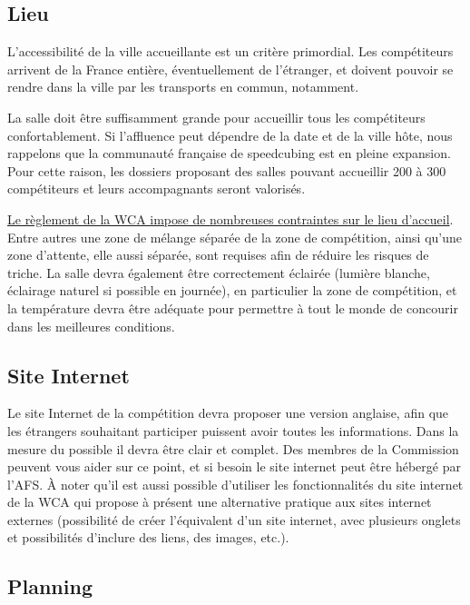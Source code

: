 \documentclass[a4paper,12pt]{scrartcl}
\begin{document}
\subsection*{Lieu}

L'accessibilité de la ville accueillante est un critère primordial. Les compétiteurs arrivent de la France entière, éventuellement de l'étranger, et doivent pouvoir se rendre dans la ville par les transports en commun, notamment.

La salle doit être suffisamment grande pour accueillir tous les compétiteurs confortablement.
Si l'affluence peut dépendre de la date et de la ville hôte, nous rappelons que la communauté française de speedcubing est en pleine expansion. Pour cette raison, les dossiers proposant des salles pouvant accueillir 200 à 300 compétiteurs et leurs accompagnants seront valorisés.

\href{https://www.worldcubeassociation.org/regulations/translations/french/#article-7-environment}{Le règlement de la WCA impose de nombreuses contraintes sur le lieu d'accueil}.
Entre autres une zone de mélange séparée de la zone de compétition, ainsi qu'une zone d'attente, elle aussi séparée, sont requises afin de réduire les risques de triche.
La salle devra également être correctement éclairée (lumière blanche, éclairage naturel si possible en journée), en particulier la zone de compétition, et la température devra être adéquate pour permettre à tout le monde de concourir dans les meilleures conditions.


\subsection*{Site Internet}

Le site Internet de la compétition devra proposer une version anglaise, afin que les étrangers souhaitant participer puissent avoir toutes les informations.
Dans la mesure du possible il devra être clair et complet. Des membres de la Commission peuvent vous aider sur ce point, et si besoin le site internet peut être hébergé par l'AFS. À noter qu'il est aussi possible d'utiliser les fonctionnalités du site internet de la WCA qui propose à présent une alternative pratique aux sites internet externes (possibilité de créer l'équivalent d'un site internet, avec plusieurs onglets et possibilités d'inclure des liens, des images, etc.).


\subsection*{Planning}
\end{document}

